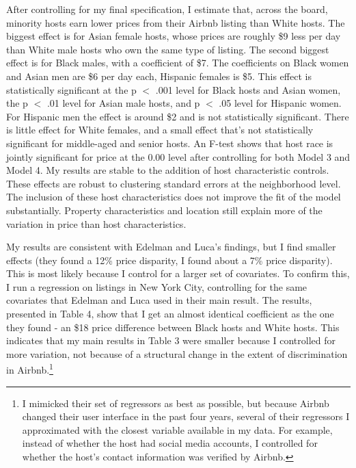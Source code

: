 \documentclass[11pt, oneside]{article}
\begin{document}
After controlling for my final specification, I estimate that, across the board, minority hosts earn lower prices from their Airbnb listing than White hosts. The biggest effect is for Asian female hosts, whose prices are roughly \$9 less per day than White male hosts who own the same type of listing. The second biggest effect is for Black males, with a coefficient of \$7. The coefficients on Black women and Asian men are \$6 per day each, Hispanic females is \$5. This effect is statistically significant at the p $<$ .001 level for Black hosts and Asian women, the p $<$ .01 level for Asian male hosts, and p $<$ .05 level for Hispanic women. For Hispanic men the effect is around \$2 and is not statistically significant. There is little effect for White females, and a small effect that's not statistically significant for middle-aged and senior hosts. An F-test shows that host race is jointly significant for price at the 0.00 level after controlling for both Model 3 and Model 4. My results are stable to the addition of host characteristic controls. These effects are robust to clustering standard errors at the neighborhood level. The inclusion of these host characteristics does not improve the fit of the model substantially. Property characteristics and location still explain more of the variation in price than host characteristics. 

My results are consistent with Edelman and Luca's findings, but I find smaller effects (they found a 12\% price disparity, I found about a 7\% price disparity). This is most likely because I control for a larger set of covariates. To confirm this, I run a regression on listings in New York City, controlling for the same covariates that Edelman and Luca used in their main result. The results, presented in Table 4, show that I get an almost identical coefficient as the one they found - an \$18 price difference between Black hosts and White hosts. This indicates that my main results in Table 3 were smaller because I controlled for more variation, not because of a structural change in the extent of discrimination in Airbnb.\footnote{I mimicked their set of regressors as best as possible, but because Airbnb changed their user interface in the past four years, several of their regressors I approximated with the closest variable available in my data. For example, instead of whether the host had social media accounts, I controlled for whether the host's contact information was verified by Airbnb.}
\end{document}
